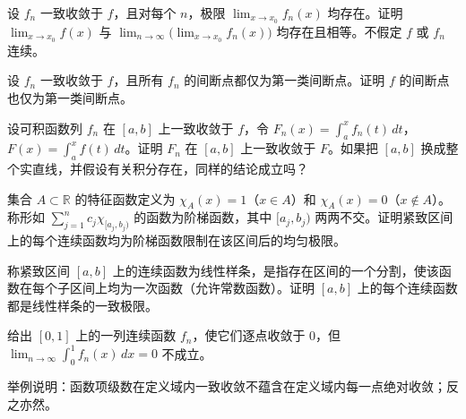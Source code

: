 \noindent\begin{minipage}{\textwidth}
设 $f_n$ 一致收敛于 $f$，且对每个 $n$，极限 $\lim_{x\to x_0}f_n(x)$ 均存在。证明 $\lim_{x\to x_0}f(x)$ 与 $\lim_{n\to\infty}\bigl(\lim_{x\to x_0}f_n(x)\bigr)$ 均存在且相等。不假定 $f$ 或 $f_n$ 连续。
\end{minipage}\par\vfill
\noindent\begin{minipage}{\textwidth}
设 $f_n$ 一致收敛于 $f$，且所有 $f_n$ 的间断点都仅为第一类间断点。证明 $f$ 的间断点也仅为第一类间断点。
\end{minipage}\par\vfill
\newpage
\noindent\begin{minipage}{\textwidth}
设可积函数列 $f_n$ 在 $[a,b]$ 上一致收敛于 $f$，令 $F_n(x)=\int_a^x f_n(t)\,dt$，$F(x)=\int_a^x f(t)\,dt$。证明 $F_n$ 在 $[a,b]$ 上一致收敛于 $F$。如果把 $[a,b]$ 换成整个实直线，并假设有关积分存在，同样的结论成立吗？
\end{minipage}\par\vfill
\noindent\begin{minipage}{\textwidth}
集合 $A\subset\mathbb R$ 的特征函数定义为 $\chi_A(x)=1$（$x\in A$）和 $\chi_A(x)=0$（$x\notin A$）。称形如 $\sum_{j=1}^n c_j\chi_{[a_j,b_j)}$ 的函数为阶梯函数，其中 $[a_j,b_j)$ 两两不交。证明紧致区间上的每个连续函数均为阶梯函数限制在该区间后的均匀极限。
\end{minipage}\par\vfill
\noindent\begin{minipage}{\textwidth}
称紧致区间 $[a,b]$ 上的连续函数为线性样条，是指存在区间的一个分割，使该函数在每个子区间上均为一次函数（允许常数函数）。证明 $[a,b]$ 上的每个连续函数都是线性样条的一致极限。
\end{minipage}\par\vfill
\noindent\begin{minipage}{\textwidth}
给出 $[0,1]$ 上的一列连续函数 $f_n$，使它们逐点收敛于 $0$，但 $\lim_{n\to\infty}\int_0^1 f_n(x)\,dx=0$ 不成立。
\end{minipage}\par\vfill
\newpage
\noindent\begin{minipage}{\textwidth}
举例说明：函数项级数在定义域内一致收敛不蕴含在定义域内每一点绝对收敛；反之亦然。
\end{minipage}\par\vfill
